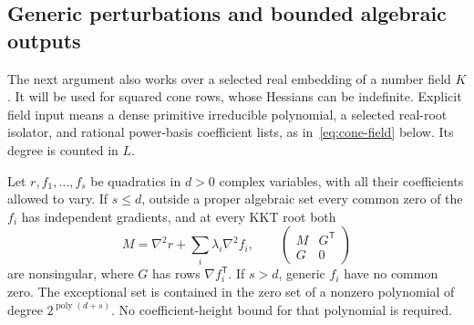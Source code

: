 \subsection{Generic perturbations and bounded algebraic outputs}
\label{app:ncq-elimination}

The next argument also works over a selected real embedding of a number
field $K$. It will be used for squared cone rows, whose Hessians can be
indefinite. Explicit field input means a dense primitive irreducible
polynomial, a selected real-root isolator, and rational power-basis
coefficient lists, as in~\eqref{eq:cone-field} below. Its degree is
counted in $L$.

\begin{lemma}
\label{lem:ncq-generic}
Let $r,f_1,\ldots,f_s$ be quadratics in $d>0$ complex variables, with
all their coefficients allowed to vary. If $s\le d$, outside a proper
algebraic set every common zero of the $f_i$ has independent gradients,
and at every KKT root both
\[
 M=\nabla^2r+\sum_i\lambda_i\nabla^2f_i,
 \qquad \begin{pmatrix}M&G^{\mathsf T}\\G&0\end{pmatrix}
\]
are nonsingular, where $G$ has rows $\nabla f_i^{\mathsf T}$. If $s>d$,
generic $f_i$ have no common zero. The exceptional set is contained in the
zero set of a nonzero polynomial of degree $2^{\operatorname{poly}(d+s)}$.
No coefficient-height bound for that polynomial is required.
\end{lemma}


